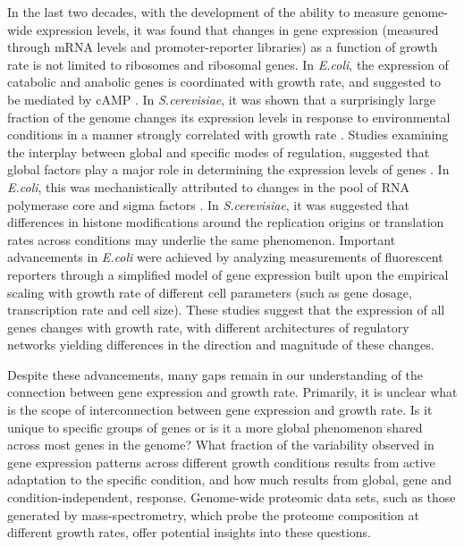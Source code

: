 In the last two decades, with the development of the ability to measure genome-wide expression levels, it was found that changes in gene expression (measured through mRNA levels and promoter-reporter libraries) as a function of growth rate is not limited to ribosomes and ribosomal genes.
In \emph{E.coli}, the expression of catabolic and anabolic genes is coordinated with growth rate, and suggested to be mediated by cAMP \cite{Saldanha2004}.
In \emph{S.cerevisiae}, it was shown that a surprisingly large fraction of the genome changes its expression levels in response to environmental conditions in a manner strongly correlated with growth rate \cite{Keren2013a,Gasch2000,Castrillo2007,Gerosa2013}.
Studies examining the interplay between global and specific modes of regulation, suggested that global factors play a major role in determining the expression levels of genes \cite{Gasch2000,Klumpp2009a,Scott2010,Berthoumieux2013}.
In \emph{E.coli}, this was mechanistically attributed to changes in the pool of RNA polymerase core and sigma factors \cite{Klumpp2008}.
In \emph{S.cerevisiae}, it was suggested that differences in histone modifications around the replication origins \cite{Regenberg2006} or translation rates \cite{Gasch2000} across conditions may underlie the same phenomenon.
Important advancements in \emph{E.coli} were achieved by analyzing measurements of fluorescent reporters through a simplified model of gene expression built upon the empirical scaling with growth rate of different cell parameters (such as gene dosage, transcription rate and cell size)\cite{Klumpp2009a}.
These studies suggest that the expression of all genes changes with growth rate, with different architectures of regulatory networks yielding differences in the direction and magnitude of these changes. 


Despite these advancements, many gaps remain in our understanding of the connection between gene expression and growth rate.
Primarily, it is unclear what is the scope of interconnection between gene expression and growth rate.
Is it unique to specific groups of genes or is it a more global phenomenon shared across most genes in the genome?
What fraction of the variability observed in gene expression patterns across different growth conditions results from active adaptation to the specific condition, and how much results from global, gene and condition-independent, response.
Genome-wide proteomic data sets, such as those generated by mass-spectrometry, which probe the proteome composition at different growth rates, offer potential insights into these questions.

